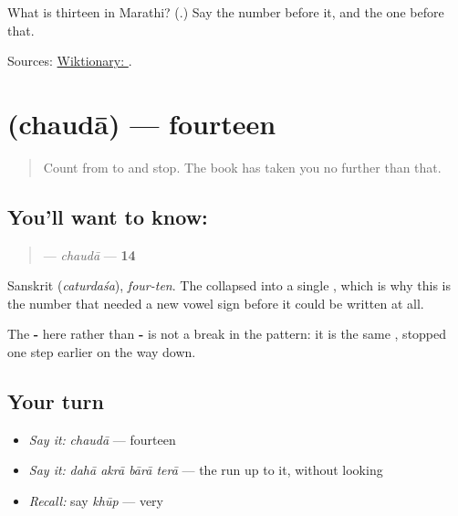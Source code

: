 \begin{tcolorbox}[breakable,colback=teal!4,colframe=teal!35!black,title={Before you move on}]
What is thirteen in Marathi? (\textbf{}.) Say the number before it, and the one before that.

Sources: \href{https://en.wiktionary.org/wiki/\%E0\%A4\%A4\%E0\%A5\%87\%E0\%A4\%B0\%E0\%A4\%BE}{Wiktionary: }.
\end{tcolorbox}
\section[\texorpdfstring{\mr{चौदा} (chaudā)}{चौदा (chaudā)}]{ (chaudā) — fourteen}

\label{lesson:MR-C57-chauda}



\begin{quote}
Count from \textbf{} to \textbf{} and stop. The book has taken you no further than that.
\end{quote}

\subsection*{You'll want to know: }
\begin{quote}
\textbf{} — \emph{chaudā} — \textbf{14}
\end{quote}

Sanskrit \textbf{} (\emph{caturdaśa}), \emph{four-ten}. The \textbf{} collapsed into a single \textbf{}, which is why this is the number that needed a new vowel sign before it could be written at all.

The \textbf{-} here rather than \textbf{-} is not a break in the pattern: it is the same \textbf{}, stopped one step earlier on the way down.

\subsection*{Your turn}
\begin{itemize}
\raggedright
  \item \emph{Say it:} \emph{chaudā} — fourteen
  \item \emph{Say it:} \emph{dahā akrā bārā terā} — the run up to it, without looking
  \item \emph{Recall:} say \emph{khūp} — very
\end{itemize}

